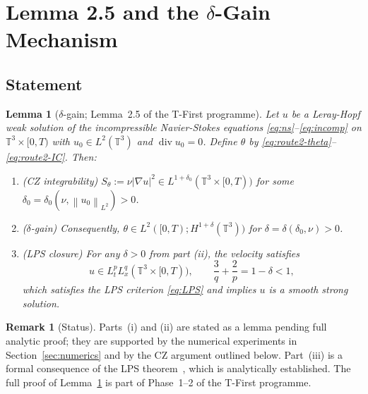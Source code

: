 \documentclass[11pt]{article}
\newtheorem{lemma}[theorem]{Lemma}
\theoremstyle{definition}
\newtheorem{remark}[theorem]{Remark}
\newcommand{\T}{\mathbb{T}}
\newcommand{\norm}[1]{\left\|#1\right\|}
\newcommand{\abs}[1]{\left|#1\right|}
\newcommand{\grad}{\nabla}
\newcommand{\divg}{\operatorname{div}}
\newcommand{\thetafield}{\theta}
\begin{document}
\section{Lemma 2.5 and the $\delta$-Gain Mechanism}
\label{sec:theory}

\subsection{Statement}

\begin{lemma}[$\delta$-gain; Lemma~2.5 of the T-First programme]
\label{lem:delta-gain}
Let $u$ be a Leray-Hopf weak solution of the incompressible Navier-Stokes
equations \eqref{eq:ns}--\eqref{eq:incomp} on $\T^3 \times [0,T)$ with $u_0 \in L^2(\T^3)$
and $\divg u_0 = 0$. Define $\thetafield$ by \eqref{eq:route2-theta}--\eqref{eq:route2-IC}.
Then:
\begin{enumerate}[label=(\roman*)]
  \item \textup{(CZ integrability)} $S_\theta := \nu \abs{\grad u}^2 \in L^{1+\delta_0}(\T^3 \times [0,T))$
    for some $\delta_0 = \delta_0(\nu, \norm{u_0}_{L^2}) > 0$.
  \item \textup{($\delta$-gain)} Consequently,
    $\thetafield \in L^2([0,T); H^{1+\delta}(\T^3))$ for $\delta = \delta(\delta_0, \nu) > 0$.
  \item \textup{(LPS closure)} For any $\delta > 0$ from part (ii), the velocity satisfies
    \begin{equation}
      u \in L^p_t L^q_x(\T^3 \times [0,T)), \qquad
      \frac{3}{q} + \frac{2}{p} = 1 - \delta < 1,
      \label{eq:LPS-closed}
    \end{equation}
    which satisfies the LPS criterion \eqref{eq:LPS} and implies $u$ is a smooth strong solution.
\end{enumerate}
\end{lemma}

\begin{remark}[Status]
Parts~(i) and (ii) are stated as a lemma pending full analytic proof;
they are supported by the numerical experiments in Section~\ref{sec:numerics}
and by the CZ argument outlined below. Part~(iii) is a formal consequence of the
LPS theorem~\cite{Prodi1959,Serrin1962,Ladyzhenskaya1967}, which is analytically
established. The full proof of Lemma~\ref{lem:delta-gain} is part of Phase~1--2
of the T-First programme.
\end{remark}
\end{document}
